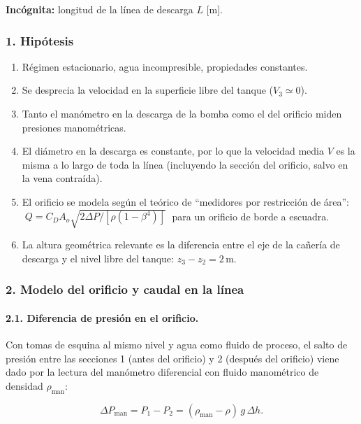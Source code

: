 \documentclass[12pt, a4paper]{article}
\begin{document}
\noindent
\textbf{Incógnita:} longitud de la línea de descarga $L$ [m].

\subsubsection*{1. Hipótesis}

\begin{enumerate}
  \item Régimen estacionario, agua incompresible, propiedades constantes.
  \item Se desprecia la velocidad en la superficie libre del tanque ($V_3\simeq 0$).
  \item Tanto el manómetro en la descarga de la bomba como el del orificio
        miden presiones manométricas.
  \item El diámetro en la descarga es constante, por lo que la velocidad media $V$
        es la misma a lo largo de toda la línea (incluyendo la sección del orificio,
        salvo en la vena contraída).
  \item El orificio se modela según el teórico de ``medidores por restricción de área'':
        $\;Q = C_D A_o \sqrt{2\Delta P/[\rho(1-\beta^4)]}\;$ para un orificio de borde a escuadra.
  \item La altura geométrica relevante es la diferencia entre el eje de la cañería de descarga
        y el nivel libre del tanque: $z_3 - z_2 = 2\,\text{m}$.
\end{enumerate}

\subsubsection*{2. Modelo del orificio y caudal en la línea}

\paragraph{2.1. Diferencia de presión en el orificio.}

Con tomas de esquina al mismo nivel y agua como fluido de proceso, el salto de presión
entre las secciones 1 (antes del orificio) y 2 (después del orificio) viene dado por
la lectura del manómetro diferencial con fluido manométrico de densidad
$\rho_\text{man}$:

\[
\Delta P_{\text{man}} = P_1 - P_2 = (\rho_\text{man} - \rho)\,g\,\Delta h.
\]
\end{document}
